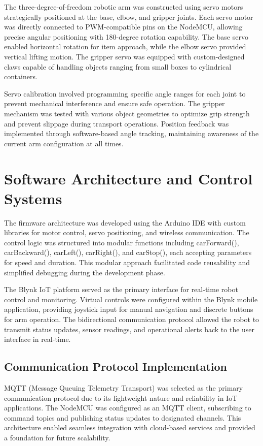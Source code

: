 The three-degree-of-freedom robotic arm was constructed using servo motors strategically positioned at the base, elbow, and gripper joints. Each servo motor was directly connected to PWM-compatible pins on the NodeMCU, allowing precise angular positioning with 180-degree rotation capability. The base servo enabled horizontal rotation for item approach, while the elbow servo provided vertical lifting motion. The gripper servo was equipped with custom-designed claws capable of handling objects ranging from small boxes to cylindrical containers.

Servo calibration involved programming specific angle ranges for each joint to prevent mechanical interference and ensure safe operation. The gripper mechanism was tested with various object geometries to optimize grip strength and prevent slippage during transport operations. Position feedback was implemented through software-based angle tracking, maintaining awareness of the current arm configuration at all times.

\section{Software Architecture and Control Systems}

The firmware architecture was developed using the Arduino IDE with custom libraries for motor control, servo positioning, and wireless communication. The control logic was structured into modular functions including carForward(), carBackward(), carLeft(), carRight(), and carStop(), each accepting parameters for speed and duration. This modular approach facilitated code reusability and simplified debugging during the development phase.

The Blynk IoT platform served as the primary interface for real-time robot control and monitoring. Virtual controls were configured within the Blynk mobile application, providing joystick input for manual navigation and discrete buttons for arm operation. The bidirectional communication protocol allowed the robot to transmit status updates, sensor readings, and operational alerts back to the user interface in real-time.

\subsection{Communication Protocol Implementation}

MQTT (Message Queuing Telemetry Transport) was selected as the primary communication protocol due to its lightweight nature and reliability in IoT applications. The NodeMCU was configured as an MQTT client, subscribing to command topics and publishing status updates to designated channels. This architecture enabled seamless integration with cloud-based services and provided a foundation for future scalability.

